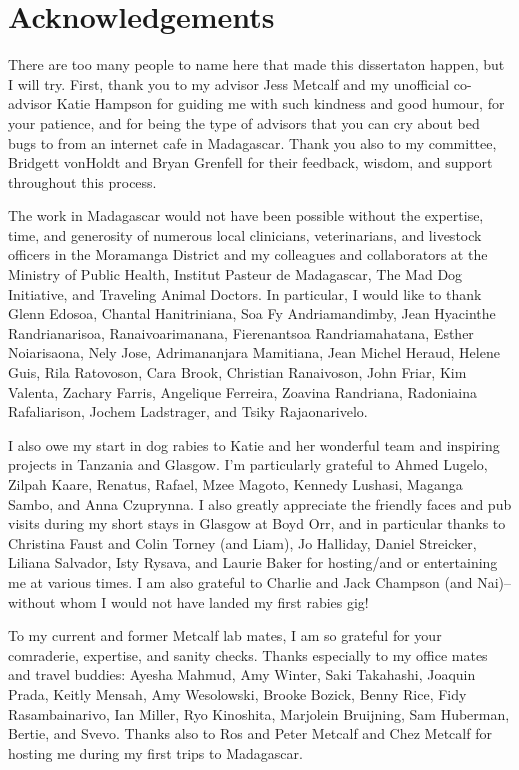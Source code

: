 \newpage

\section*{Acknowledgements}

There are too many people to name here that made this dissertaton happen, but I will try. First, thank you to my advisor Jess Metcalf and my unofficial co-advisor Katie Hampson for guiding me with such kindness and good humour, for your patience, and for being the type of advisors that you can cry about bed bugs to from an internet cafe in Madagascar. Thank you also to my committee, Bridgett vonHoldt and Bryan Grenfell for their feedback, wisdom, and support throughout this process. 

The work in Madagascar would not have been possible without the expertise, time, and generosity of numerous local clinicians, veterinarians, and livestock officers in the Moramanga District and my colleagues and collaborators at the Ministry of Public Health, Institut Pasteur de Madagascar, The Mad Dog Initiative, and Traveling Animal Doctors. In particular, I would like to thank Glenn Edosoa, Chantal Hanitriniana, Soa Fy Andriamandimby, Jean Hyacinthe Randrianarisoa, Ranaivoarimanana, Fierenantsoa Randriamahatana, Esther Noiarisaona, Nely Jose, Adrimananjara Mamitiana, Jean Michel Heraud, Helene Guis, Rila Ratovoson, Cara Brook, Christian Ranaivoson, John Friar, Kim Valenta, Zachary Farris, Angelique Ferreira, Zoavina Randriana, Radoniaina Rafaliarison, Jochem Ladstrager, and Tsiky Rajaonarivelo.

I also owe my start in dog rabies to Katie and her wonderful team and inspiring projects in Tanzania and Glasgow. I'm particularly grateful to Ahmed Lugelo, Zilpah Kaare, Renatus, Rafael, Mzee Magoto, Kennedy Lushasi, Maganga Sambo, and Anna Czuprynna. I also greatly appreciate the friendly faces and pub visits during my short stays in Glasgow at Boyd Orr, and in particular thanks to Christina Faust and Colin Torney (and Liam), Jo Halliday, Daniel Streicker, Liliana Salvador, Isty Rysava, and Laurie Baker for hosting/and or entertaining me at various times. I am also grateful to Charlie and Jack Champson (and Nai)-- without whom I would not have landed my first rabies gig! 

To my current and former Metcalf lab mates, I am so grateful for your comraderie, expertise, and sanity checks. Thanks especially to my office mates and travel buddies: Ayesha Mahmud, Amy Winter, Saki Takahashi, Joaquin Prada, Keitly Mensah, Amy Wesolowski, Brooke Bozick, Benny Rice, Fidy Rasambainarivo, Ian Miller, Ryo Kinoshita, Marjolein Bruijning, Sam Huberman, Bertie, and Svevo. Thanks also to Ros and Peter Metcalf and Chez Metcalf for hosting me during my first trips to Madagascar.

